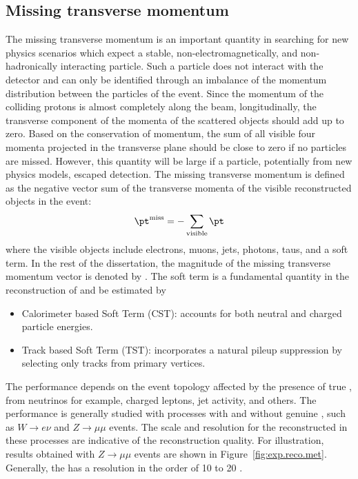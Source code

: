 \subsection{Missing transverse momentum}
The missing transverse momentum is an important quantity in searching for new physics scenarios which expect a stable, 
non-electromagnetically, and non-hadronically interacting 
particle. Such a particle does not interact with the detector and can only be identified through an imbalance of the momentum 
distribution between the particles 
of the event. 
Since the momentum of the colliding protons is almost completely along the beam, longitudinally, 
the transverse component of the momenta of the 
scattered objects should add up to zero.
Based on the conservation of momentum, the sum of all visible four momenta projected in the transverse plane should be close to zero if 
no particles are missed.
However, this quantity will be large if a particle, potentially from new physics models, escaped detection. 
The missing transverse momentum is defined as the negative vector sum of the transverse momenta of the visible reconstructed objects in the
 event: 
\begin{equation}
\pt^{\rm{miss}} = - \sum_\text{visible} \pt
\end{equation}
where the visible objects include electrons, muons, jets, photons, taus, and a soft term.
In the rest of the dissertation, the magnitude of the missing transverse momentum vector is denoted by \met.
The soft term  is  a fundamental quantity in the reconstruction of \met and be estimated by 
\begin{itemize}
\item Calorimeter based Soft Term (CST): accounts for both neutral and charged particle energies.
\item Track based Soft Term (TST): incorporates a natural pileup suppression by selecting only tracks from primary vertices.
\end{itemize}

The \met performance depends on the event topology affected by the presence of true \met, from neutrinos for example,
charged leptons, jet activity, and others.
The \met performance is generally studied with processes with and without genuine \met, such as 
$W \to e \nu$ and $Z\to\mu\mu$ events. 
The scale and resolution for the reconstructed \met in these processes are indicative of the reconstruction quality.
For illustration, results obtained with  $Z\to\mu\mu$ events are shown in Figure~\ref{fig:exp.reco.met}.
Generally, the \met has a resolution in the order of 10 to 20 \GeV.



